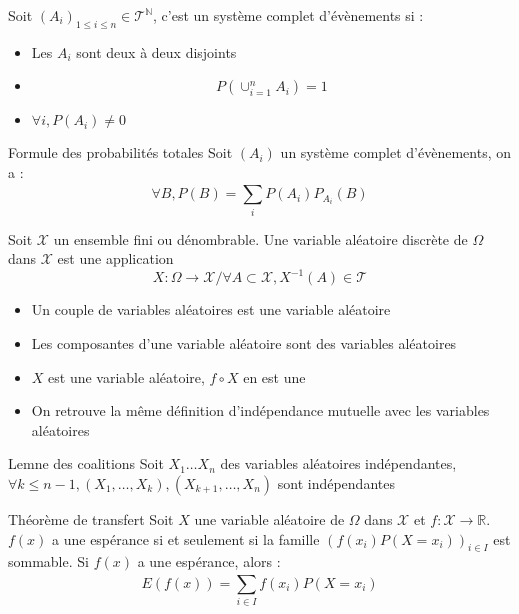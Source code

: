 \documentclass[french, a4paper, 10pt, twocolumn]{article}
\newcommand{\N}{\mathbb{N}}   %
\newcommand{\R}{\mathbb{R}}   %
\begin{document}
\begin{definition}
    Soit \((A_i)_{1 \leq i \leq n} \in \mathcal{T}^{\N}\), c'est un système complet d'évènements si :
    \begin{itemize}
        \item Les \(A_i\) sont deux à deux disjoints
        \item \[P(\cup_{i=1}^{n}A_i)=1\]
        \item \(\forall i, P(A_i)\neq 0\)
    \end{itemize}
\end{definition}

\begin{theoreme}{Formule des probabilités totales}
    Soit $(A_i)$ un système complet d'évènements, on a :
        \[\forall B, P(B)=\sum_{i}^{}P(A_i)P_{A_i}(B)\]
\end{theoreme}

\begin{definition}
    Soit \(\mathcal{X}\) un ensemble fini ou dénombrable.
    Une variable aléatoire discrète de \(\Omega\) dans \(\mathcal{X}\) est une application
        \[X : \Omega \rightarrow \mathcal{X} / \forall A \subset \mathcal{X}, X^{-1}(A) \in \mathcal{T}\]
    
    \tcblower
    \begin{itemize}
        \item Un couple de variables aléatoires est une variable aléatoire
        \item Les composantes d'une variable aléatoire sont des variables aléatoires
        \item \(X\) est une variable aléatoire, \(f\circ X\) en est une
        \item On retrouve la même définition d'indépendance mutuelle avec les variables aléatoires
    \end{itemize}
\end{definition}

\begin{theoreme}{Lemne des coalitions}
    Soit \(X_1\dots X_n\) des variables aléatoires indépendantes,
    \(\forall k \leq n-1, (X_1,\dots,X_k),(X_{k+1},\dots,X_n)\) sont indépendantes
\end{theoreme}

\begin{theoreme}{Théorème de transfert}
    Soit \(X\) une variable aléatoire de \(\Omega\) dans \(\mathcal{X}\) et \(f : \mathcal{X} \rightarrow \R\).
    \(f(x)\) a une espérance si et seulement si la famille \((f(x_i)P(X=x_i))_{i\in I}\) est sommable.
    Si \(f(x)\) a une espérance, alors : 
        \[E(f(x))=\sum_{i\in I}^{}f(x_i)P(X=x_i)\]
\end{theoreme}
\end{document}
